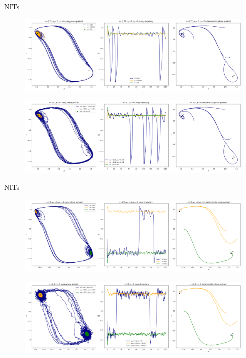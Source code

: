 \documentclass[10pt]{beamer}
\begin{document}
\begin{frame}{NITs}
	\begin{figure}
		\includegraphics[width=\textwidth, height=\textheight,keepaspectratio]{figures_2/NIT-r1.77-vs-eps-adv.png}
	\end{figure}
	
	\begin{figure}
		\includegraphics[width=\textwidth, height=\textheight,keepaspectratio]{figures_2/NIT-r1.77-vs-omega-adv.png}
	\end{figure}
\end{frame}

\begin{frame}{NITs}
	\begin{figure}
		\includegraphics[width=\textwidth, height=\textheight,keepaspectratio]{figures_2/NIT-r2-vs-eps-adv.png}
	\end{figure}
	
	\begin{figure}
		\includegraphics[width=\textwidth, height=\textheight,keepaspectratio]{figures_2/NIT-r2-vs-omega-adv.png}
	\end{figure}
\end{frame}
\end{document}
